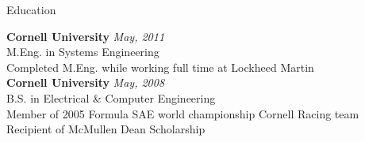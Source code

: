 \documentclass{resume} %
\begin{document}

\begin{rSection}{Education}

{\bf Cornell University} \hfill {\em May, 2011} \\ 
M.Eng. in Systems Engineering \\
Completed M.Eng. while working full time at Lockheed Martin \\

{\bf Cornell University} \hfill {\em May, 2008} \\ 
B.S. in Electrical \& Computer Engineering \\
Member of 2005 Formula SAE world championship Cornell Racing team \\
Recipient of McMullen Dean Scholarship \\
\end{rSection}

\end{document}
